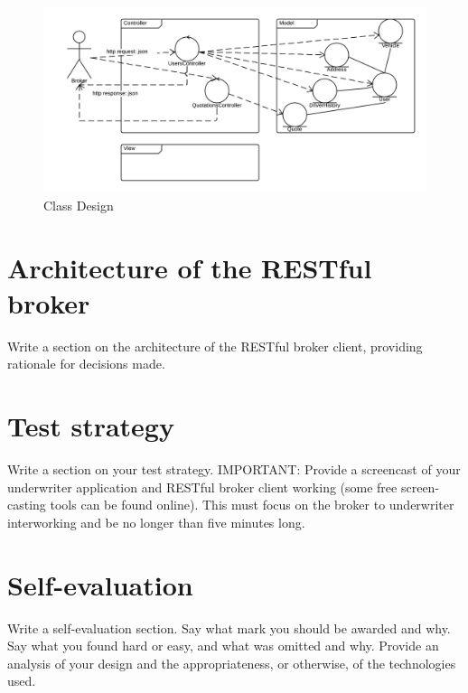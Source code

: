 \documentclass[10pt,a4paper,headinclude=true,twoside]{report}
\begin{document}
\begin{figure}[H]
\centering
\centerline{\includegraphics[scale=0.25]{./ClassDesign}}
\caption{Class Design}
\label{fig:ClassDesign}
\end{figure}


\section{Architecture of the RESTful broker}
Write a section on the architecture of the RESTful broker client,
providing rationale for decisions made.
\section{Test strategy}
Write a section on your test strategy. IMPORTANT: Provide a
screencast of your underwriter application and RESTful broker client
working (some free screen-casting tools can be found online). This
must focus on the broker to underwriter interworking and be no longer
than five minutes long.
\section{Self-evaluation}
Write a self-evaluation section. Say what mark you should be awarded
and why. Say what you found hard or easy, and what was omitted and
why. Provide an analysis of your design and the appropriateness, or
otherwise, of the technologies used.



\end{document}
